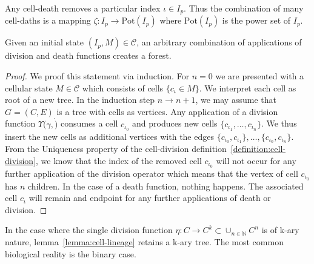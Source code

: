 \begin{definition}
    \label{definition:cell-death}
    Any cell-death removes a particular index $\iota\in I_p$.
    Thus the combination of many cell-daths is a mapping $\zeta:I_p\rightarrow \text{Pot}(I_p)$
    where $\text{Pot}(I_p)$ is the power set of $I_p$.

\end{definition}

\begin{lemma}
    \label{lemma:cell-lineage}
    Given an initial state $(I_p,M)\in\mathscr{C}$, an arbitrary combination of applications of
    division and death functions creates a forest.
\end{lemma}
\begin{proof}
    We proof this statement via induction. For $n=0$ we are presented with a cellular state
    $M\in\mathscr{C}$ which consists of cells $\{c_\iota\in M\}$.
    We interpret each cell as root of a new tree.
    In the induction step $n\rightarrow n+1$, we may assume that $G=(C,E)$ is a tree with
    cells as vertices.
    Any application of a division function $\Upsilon(\gamma, \dot)$ consumes a cell $c_{\iota_0}$
    and produces new cells $\{c_{\iota_1},\dots,c_{\iota_n}\}$.
    We thus insert the new cells as additional vertices with the edges
    $\{c_{\iota_0},c_{\iota_1}\},\dots,\{c_{\iota_0},c_{\iota_n}\}$.
    From the Uniqueness property of the cell-division definition~\ref{definition:cell-division},
    we know that the index of the removed cell $c_{\iota_0}$ will not occur for any further
    application of the division operator which means that the vertex of cell $c_{\iota_0}$ has $n$
    children.
    In the case of a death function, nothing happens.
    The associated cell $c_\iota$ will remain and endpoint for any further applications of death
    or division.
\end{proof}
\begin{corollary}
    In the case where the single division function
    $\eta:C\rightarrow C^k\subset\cup_{n\in\mathbb{N}}C^n$
    is of k-ary nature, lemma~\ref{lemma:cell-lineage} retains a k-ary tree.
    The most common biological reality is the binary case.
\end{corollary}

